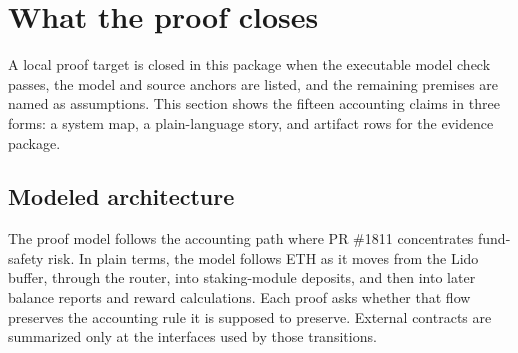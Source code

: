\section{What the proof closes}
\label{sec:proof-closure}

\newcommand{\theoremid}[2]{\texttt{\footnotesize #1}\newline\texttt{\footnotesize #2}}
\newcommand{\proofhandle}[3]{\texttt{\footnotesize #1}\newline\theoremid{#2}{#3}}

\noindent A local proof target is closed in this package when the executable
model check passes, the model and source anchors are listed, and the remaining
premises are named as assumptions. This section shows the fifteen accounting claims
in three forms: a system map, a plain-language story, and artifact rows for the
evidence package.

\subsection*{Modeled architecture}

\noindent The proof model follows the accounting path where PR \#1811 concentrates
fund-safety risk. In plain terms, the model follows ETH as it moves from the
Lido buffer, through the router, into staking-module deposits, and then into
later balance reports and reward calculations. Each proof asks whether that flow
preserves the accounting rule it is supposed to preserve. External contracts are
summarized only at the interfaces used by those transitions.

